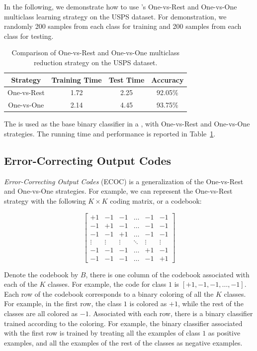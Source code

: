 In the following, we demonstrate how to use \shogun{}'s One-vs-Rest and 
One-vs-One multiclass learning strategy on the USPS dataset.  For 
demonstration, we randomly 200 samples from each class for training and 200 
samples from each class for testing.

\begin{table}\centering
	\begin{tabular}{cccc}
	\toprule
	Strategy & Training Time & Test Time & Accuracy \\
	\midrule
	One-vs-Rest & 1.72       & 2.25      & 92.05\%  \\
	One-vs-One  & 2.14       & 4.45      & 93.75\%  \\
	\bottomrule
	\end{tabular}
	\caption{Comparison of One-vs-Rest and One-vs-One multiclass reduction
		strategy on the USPS dataset.}
	\label{tab:ovr-vs-ovo}
\end{table}

The  is used as the base binary classifier in a
, with One-vs-Rest and One-vs-One
strategies. The running time and performance is reported in
Table~\ref{tab:ovr-vs-ovo}.

\subsection{Error-Correcting Output Codes}

\emph{Error-Correcting Output Codes} (ECOC) \citep{ECOC95,ECOCUnify} is a
generalization of the One-vs-Rest and One-vs-One strategies. For example, we
can represent the One-vs-Rest strategy with the following $K\times K$ coding 
matrix, or a codebook:

\[
    \begin{bmatrix}
    +1 & -1 & -1 & \ldots & -1 & -1 \\
    -1 & +1 & -1 & \ldots & -1 & -1\\
    -1 & -1 & +1 & \ldots & -1 & -1\\
    \vdots & \vdots & \vdots & \ddots & \vdots & \vdots \\
    -1 & -1 & -1 & \ldots & +1 & -1 \\
    -1 & -1 & -1 & \ldots & -1 & +1
    \end{bmatrix}
\]

Denote the codebook by $B$, there is one column of the codebook associated with
each of the $K$ classes. For example, the code for class $1$ is
$[+1,-1,-1,\ldots,-1]$. Each row of the codebook corresponds to a binary
coloring of all the $K$ classes. For example, in the first row, the class $1$
is colored as $+1$, while the rest of the classes are all colored as $-1$.
Associated with each row, there is a binary classifier trained according to the
coloring. For example, the binary classifier associated with the first row is
trained by treating all the examples of class $1$ as positive examples, and all
the examples of the rest of the classes as negative examples.

